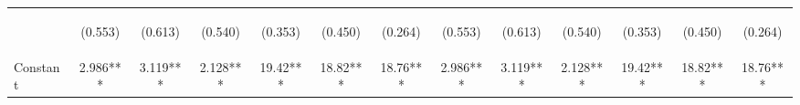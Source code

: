 \documentclass[]{article}
\begin{document}
\begin{center}
\begin{tabular}{lcccccccccccc}
\vspace{4pt} & \begin{footnotesize}(0.553)\end{footnotesize} & \begin{footnotesize}(0.613)\end{footnotesize} & \begin{footnotesize}(0.540)\end{footnotesize} & \begin{footnotesize}(0.353)\end{footnotesize} & \begin{footnotesize}(0.450)\end{footnotesize} & \begin{footnotesize}(0.264)\end{footnotesize} & \begin{footnotesize}(0.553)\end{footnotesize} & \begin{footnotesize}(0.613)\end{footnotesize} & \begin{footnotesize}(0.540)\end{footnotesize} & \begin{footnotesize}(0.353)\end{footnotesize} & \begin{footnotesize}(0.450)\end{footnotesize} & \begin{footnotesize}(0.264)\end{footnotesize} \\
Constant & 2.986*** & 3.119*** & 2.128*** & 19.42*** & 18.82*** & 18.76*** & 2.986*** & 3.119*** & 2.128*** & 19.42*** & 18.82*** & 18.76*** \\

\end{tabular}
\end{center}
\end{document}
